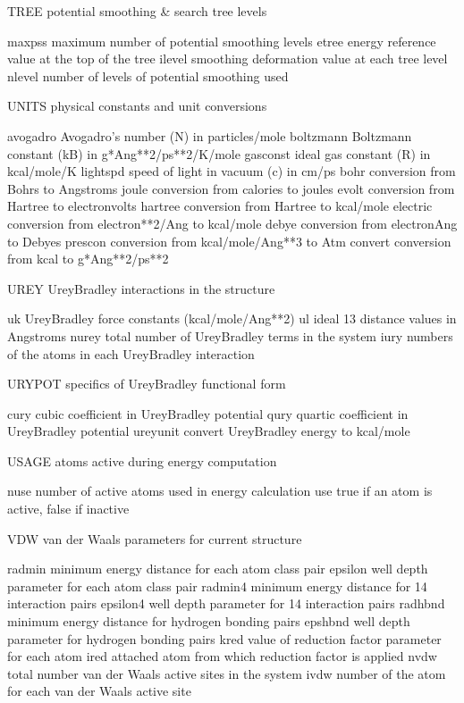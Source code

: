 \documentclass[letterpaper,11pt,english]{sphinxmanual}
\begin{document}
TREE    potential smoothing \& search tree levels

maxpss  maximum number of potential smoothing levels
etree   energy reference value at the top of the tree
ilevel  smoothing deformation value at each tree level
nlevel  number of levels of potential smoothing used

UNITS   physical constants and unit conversions

avogadro        Avogadro’s number (N) in particles/mole
boltzmann       Boltzmann constant (kB) in g*Ang**2/ps**2/K/mole
gasconst        ideal gas constant (R) in kcal/mole/K
lightspd        speed of light in vacuum (c) in cm/ps
bohr    conversion from Bohrs to Angstroms
joule   conversion from calories to joules
evolt   conversion from Hartree to electron\sphinxhyphen{}volts
hartree conversion from Hartree to kcal/mole
electric        conversion from electron**2/Ang to kcal/mole
debye   conversion from electron\sphinxhyphen{}Ang to Debyes
prescon conversion from kcal/mole/Ang**3 to Atm
convert conversion from kcal to g*Ang**2/ps**2

UREY    Urey\sphinxhyphen{}Bradley interactions in the structure

uk      Urey\sphinxhyphen{}Bradley force constants (kcal/mole/Ang**2)
ul      ideal 1\sphinxhyphen{}3 distance values in Angstroms
nurey   total number of Urey\sphinxhyphen{}Bradley terms in the system
iury    numbers of the atoms in each Urey\sphinxhyphen{}Bradley interaction

URYPOT  specifics of Urey\sphinxhyphen{}Bradley functional form

cury    cubic coefficient in Urey\sphinxhyphen{}Bradley potential
qury    quartic coefficient in Urey\sphinxhyphen{}Bradley potential
ureyunit        convert Urey\sphinxhyphen{}Bradley energy to kcal/mole

USAGE   atoms active during energy computation

nuse    number of active atoms used in energy calculation
use     true if an atom is active, false if inactive

VDW     van der Waals parameters for current structure

radmin  minimum energy distance for each atom class pair
epsilon well depth parameter for each atom class pair
radmin4 minimum energy distance for 1\sphinxhyphen{}4 interaction pairs
epsilon4        well depth parameter for 1\sphinxhyphen{}4 interaction pairs
radhbnd minimum energy distance for hydrogen bonding pairs
epshbnd well depth parameter for hydrogen bonding pairs
kred    value of reduction factor parameter for each atom
ired    attached atom from which reduction factor is applied
nvdw    total number van der Waals active sites in the system
ivdw    number of the atom for each van der Waals active site
\end{document}
